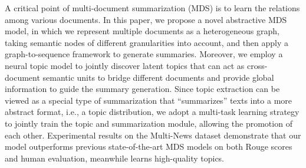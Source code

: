 A critical point of multi-document summarization (MDS) is to learn the relations among various documents. In this paper, we propose a novel abstractive MDS model, in which we represent multiple documents as a heterogeneous graph, taking semantic nodes of different granularities into account, and then apply a graph-to-sequence framework to generate summaries. Moreover, we employ a neural topic model to jointly discover latent topics that can act as cross-document semantic units to bridge different documents and provide global information to guide the summary generation. Since topic extraction can be viewed as a special type of summarization that ``summarizes'' texts into a more abstract format, i.e., a topic distribution, we adopt a multi-task learning strategy to jointly train the topic and summarization module, allowing the promotion of each other. Experimental results on the Multi-News dataset demonstrate that our model outperforms previous state-of-the-art MDS models on both Rouge scores and human evaluation, meanwhile learns high-quality topics.
